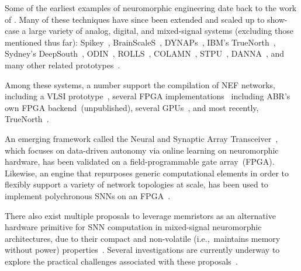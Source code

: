 Some of the earliest examples of neuromorphic engineering date back to the work of \citet{sivilotti1985novel, mead1988silicon, boahen1989heteroassociative, mahowald1991silicon}.
Many of these techniques have since been extended and scaled up to show-case a large variety of analog, digital, and mixed-signal systems (excluding those mentioned thus far):
Spikey~\citep{pfeil2013six},
BrainScaleS~\citep{schemmel2010wafer, aamir2018mixed, aamir2018accelerated},
DYNAPs~\citep{moradi2018scalable},
IBM's TrueNorth~\citep{merolla2011digital, merolla2014million, esser2016convolutional},
Sydney's DeepSouth~\citep{cummings2018},
ODIN~\citep{frenkel2018},
ROLLS~\citep{qiao2015reconfigurable, glatz2018adaptive},
COLAMN~\citep{wijekoon2012vlsi},
STPU~\citep{smith2017novel},
DANNA~\citep{daffron2016extensions, mitchell2018danna},
and many other related prototypes~\citep[e.g.,][]{glackin2009hardware, moradi2011vlsi, brink2013computing, moradi2014event, park201465k, azghadi2015programmable, binas2016precise, kim2018efficient, chen20184096, zheng2018low, larras2018fully}.


Among these systems, a number support the compilation of NEF networks, including a VLSI prototype~\citep{corradi2014}, several FPGA implementations~\citep{naylor2013managing, wang2014compact, berzish2016, wang2017neuromorphic} including ABR's own FPGA backend~(unpublished), several GPUs~\citep{bekolay2014, rasmussen2018nengodl, blouw2018a}, and most recently, TrueNorth~\citep{fischl2018}.

An emerging framework called the Neural and Synaptic Array Transceiver~\citep[NSAT;][]{detorakis2018neural}, which focuses on data-driven autonomy via online learning on neuromorphic hardware, has been validated on a field-programmable gate array~(FPGA).
Likewise, an engine that repurposes generic computational elements in order to flexibly support a variety of network topologies at scale, has been used to implement polychronous SNNs on an FPGA~\citep{wang2013neuromorphic, wang2018breaking}.

There also exist multiple proposals to leverage memristors as an alternative hardware primitive for SNN computation in mixed-signal neuromorphic architectures, due to their compact and non-volatile (i.e.,~maintains memory without power) properties~\citep{payvand2018neuromorphic}.
Several investigations are currently underway to explore the practical challenges associated with these proposals~\citep[e.g.,][]{chang2013building, kudithipudi2016design, cady2018full, boybat2018neuromorphic}.

